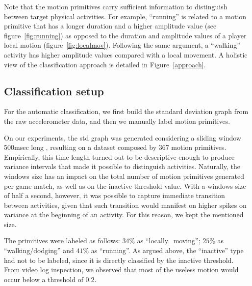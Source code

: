 
Note that the motion primitives carry sufficient information to distinguish between target physical activities. For example, ``running'' is related to a motion primitive that has a longer duration and a higher amplitude value (see figure~\ref{fig:running}) as opposed to the duration and amplitude values of a player local motion (figure~\ref{fig:localmov}). Following the same argument, a ``walking'' activity has higher amplitude values compared with a local movement. A holistic view of the classification approach is detailed in Figure~\ref{approach}. 

\subsection{Classification setup}

For the automatic classification, we first build the standard deviation graph from the raw accelerometer data, and then we manually label motion primitives. 

On our experiments, the std graph was generated considering a sliding window 500msec long %
, resulting on a dataset composed by $367$ motion primitives. Empirically, this time length turned out to be descriptive enough to produce variance intervals that made it possible to distinguish activities. Naturally, the windows size has an impact on the total number of motion primitives generated per game match, as well as on the inactive threshold value. With a windows size of half a second, however, it was possible to capture immediate transition between activities, given that such transition would manifest on higher spikes on variance at the beginning of an activity. For this reason, we kept the mentioned size. 

The primitives were labeled as follows: $34\%$ as ``locally\_moving''; $25\%$ as ``walking/dodging'' and $41\%$ as ``running''.%
As argued above, the ``inactive'' type had not to be labeled, since it is directly classified by the inactive threshold. From video log inspection, we observed that most of the useless motion would occur below a threshold of $0.2$.

